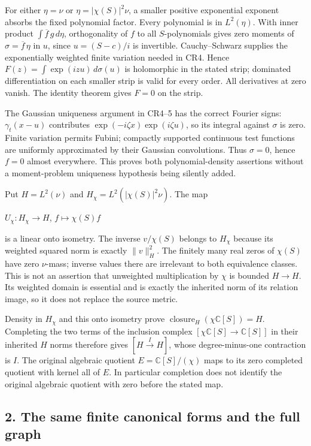 For either \(\eta=\nu\) or \(\eta=|\chi(S)|^2\nu\), a smaller positive exponential exponent absorbs the fixed polynomial factor. Every polynomial is in \(L^2(\eta)\). With inner product \(\int\overline f\,g\,d\eta\), orthogonality of \(f\) to all \(S\)-polynomials gives zero moments of \(\sigma=\overline f\,\eta\) in \(u\), since \(u=(S-c)/i\) is invertible. Cauchy--Schwarz supplies the exponentially weighted finite variation needed in CR4. Hence \(F(z)=\int\exp(izu)\,d\sigma(u)\) is holomorphic in the stated strip; dominated differentiation on each smaller strip is valid for every order. All derivatives at zero vanish. The identity theorem gives \(F=0\) on the strip.

The Gaussian uniqueness argument in CR4--5 has the correct Fourier signs: \(\gamma_t(x-u)\) contributes \(\exp(-i\zeta x)\exp(i\zeta u)\), so its integral against \(\sigma\) is zero. Finite variation permits Fubini; compactly supported continuous test functions are uniformly approximated by their Gaussian convolutions. Thus \(\sigma=0\), hence \(f=0\) almost everywhere. This proves both polynomial-density assertions without a moment-problem uniqueness hypothesis being silently added.

Put \(H=L^2(\nu)\) and \(H_\chi=L^2(|\chi(S)|^2\nu)\). The map

\(U_\chi:H_\chi\longrightarrow H\), \(f\longmapsto\chi(S)f\)

is a linear onto isometry. The inverse \(v/\chi(S)\) belongs to \(H_\chi\) because its weighted squared norm is exactly \(\|v\|_H^2\). The finitely many real zeros of \(\chi(S)\) have zero \(\nu\)-mass; inverse values there are irrelevant to both equivalence classes. This is not an assertion that unweighted multiplication by \(\chi\) is bounded \(H\longrightarrow H\). Its weighted domain is essential and is exactly the inherited norm of its relation image, so it does not replace the source metric.

Density in \(H_\chi\) and this onto isometry prove \(\operatorname{closure}_H(\chi\mathbb C[S])=H\). Completing the two terms of the inclusion complex \([\chi\mathbb C[S]\longrightarrow\mathbb C[S]]\) in their inherited \(H\) norms therefore gives \([H\xrightarrow{I}H]\), whose degree-minus-one contraction is \(I\). The original algebraic quotient \(E=\mathbb C[S]/(\chi)\) maps to its zero completed quotient with kernel all of \(E\). In particular completion does not identify the original algebraic quotient with zero before the stated map.

\subsection{2. The same finite canonical forms and the full graph}\label{the-same-finite-canonical-forms-and-the-full-graph}

